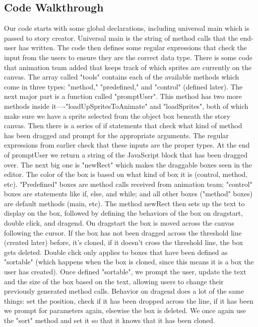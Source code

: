 \documentclass[a4paper]{article}
\begin{document}
\subsection{Code Walkthrough}
Our code starts with some global declarations, including universal main which is passed to story creator. Universal main is the string of method calls that the end-user has written.  The code then defines some regular expressions that check the input from the users to ensure they are the correct data type. There is some code that animation team added that keeps track of which sprites are currently on the canvas. The array called "tools" contains each of the available methods which come in three types: "method," "predefined," and "control" (defined later). The next major part is a function called "promptUser". This method has two more methods inside it—-"loadUpSpritesToAnimate" and "loadSprites", both of which make sure we have a sprite selected from the object box beneath the story canvas. Then there is a series of if statements that check what kind of method has been dragged and prompt for the appropriate arguments. The regular expressions from earlier check that these inputs are the proper types. At the end of promptUser we return a string of the JavaScript block that has been dragged over. \newline \newline 
The next big one is "newRect" which makes the draggable boxes seen in the editor. The color of the box is based on what kind of box it is (control, method, etc). "Predefined" boxes are method calls received from animation team; "control" boxes are statements like if, else, and while; and all other boxes ("method" boxes) are default methods (main, etc). The method newRect then sets up the text to display on the box, followed by defining the behaviors of the box on dragstart, double click, and dragend. On dragstart the box is moved across the canvas following the cursor. If the box has not been dragged across the threshold line (created later) before, it's cloned, if it doesn't cross the threshold line, the box gets deleted. Double click only applies to boxes that have been defined as "sortable" (which happens when the box is cloned, since this means it is a box the user has created). Once defined "sortable", we prompt the user, update the text and the size of the box based on the text, allowing users to change their previously generated method calls. Behavior on dragend does a lot of the same things: set the position, check if it has been dropped across the line, if it has been we prompt for parameters again, elsewise the box is deleted. We once again use the "sort" method and set it so that it knows that it has been cloned.\newline \newline 
\end{document}
